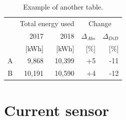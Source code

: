 \begin{table}[h]
         \centering
        \footnotesize
        \caption{Example of another table.}

         \begin{tabular}{c@{\qquad}rrrr}
          \toprule
          \multirow{2}{*}{\raisebox{-\heavyrulewidth}{Schools }} & \multicolumn{2}{c}{Total energy used}& \multicolumn{2}{c}{Change}\\
          \cmidrule{2-5}
            & 2017 & 2018 & $\Delta_{Abs}$ & $\Delta_{DiD}$\\
            & [kWh] & [kWh] & [\%] & [\%] \\
          \midrule
          A & 9,868      & 10,399 & +5 & -11\\
          B & 10,191     & 10,590 & +4 & -12\\
          \bottomrule
        \end{tabular}
     \label{tab:table2}
\end{table}

\section{Current sensor} \label{sec:current_sense_results}



